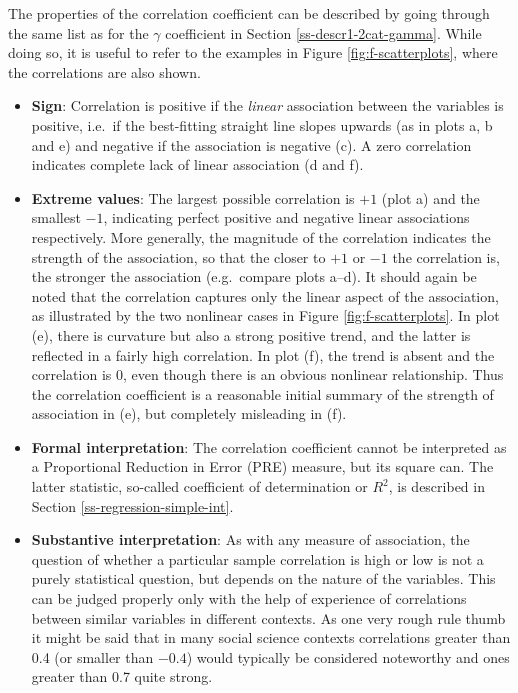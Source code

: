 \documentclass[11pt,a4paper,openany]{book}
\begin{document}
The properties of the correlation coefficient can be described by going
through the same list as for the \(\gamma\) coefficient in Section
\ref{ss-descr1-2cat-gamma}. While doing so, it is useful to refer to the
examples in Figure \ref{fig:f-scatterplots}, where the correlations are
also shown.

\begin{itemize}
\item
  \textbf{Sign}: Correlation is positive if the \emph{linear}
  association between the variables is positive, i.e.~if the
  best-fitting straight line slopes upwards (as in plots a, b and e) and
  negative if the association is negative (c). A zero correlation
  indicates complete lack of linear association (d and f).
\item
  \textbf{Extreme values}: The largest possible correlation is \(+1\)
  (plot a) and the smallest \(-1\), indicating perfect positive and
  negative linear associations respectively. More generally, the
  magnitude of the correlation indicates the strength of the
  association, so that the closer to \(+1\) or \(-1\) the correlation
  is, the stronger the association (e.g.~compare plots a--d). It should
  again be noted that the correlation captures only the linear aspect of
  the association, as illustrated by the two nonlinear cases in Figure
  \ref{fig:f-scatterplots}. In plot (e), there is curvature but also a
  strong positive trend, and the latter is reflected in a fairly high
  correlation. In plot (f), the trend is absent and the correlation is
  0, even though there is an obvious nonlinear relationship. Thus the
  correlation coefficient is a reasonable initial summary of the
  strength of association in (e), but completely misleading in (f).
\item
  \textbf{Formal interpretation}: The correlation coefficient cannot be
  interpreted as a Proportional Reduction in Error (PRE) measure, but
  its square can. The latter statistic, so-called coefficient of
  determination or \(R^{2}\), is described in Section
  \ref{ss-regression-simple-int}.
\item
  \textbf{Substantive interpretation}: As with any measure of
  association, the question of whether a particular sample correlation
  is high or low is not a purely statistical question, but depends on
  the nature of the variables. This can be judged properly only with the
  help of experience of correlations between similar variables in
  different contexts. As one very rough rule thumb it might be said that
  in many social science contexts correlations greater than 0.4 (or
  smaller than \(-0.4\)) would typically be considered noteworthy and
  ones greater than 0.7 quite strong.
\end{itemize}
\end{document}
